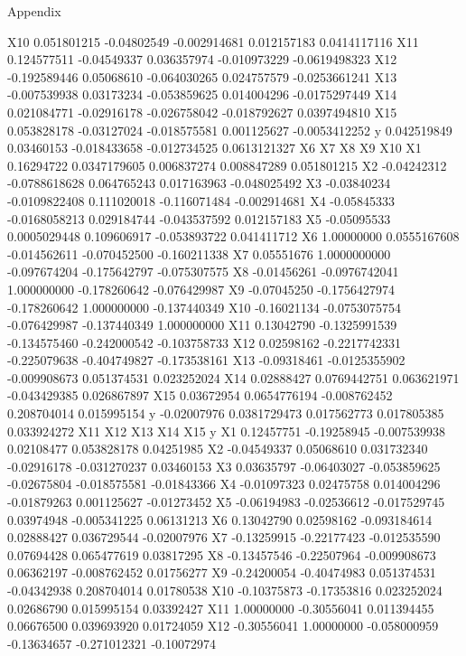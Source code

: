 \documentclass[a4paper,11pt]{article}
\begin{document}
\begin{section}{Appendix}
\begin{Schunk}
\begin{Soutput}
X10  0.051801215 -0.04802549 -0.002914681  0.012157183  0.0414117116
X11  0.124577511 -0.04549337  0.036357974 -0.010973229 -0.0619498323
X12 -0.192589446  0.05068610 -0.064030265  0.024757579 -0.0253661241
X13 -0.007539938  0.03173234 -0.053859625  0.014004296 -0.0175297449
X14  0.021084771 -0.02916178 -0.026758042 -0.018792627  0.0397494810
X15  0.053828178 -0.03127024 -0.018575581  0.001125627 -0.0053412252
y    0.042519849  0.03460153 -0.018433658 -0.012734525  0.0613121327
             X6            X7           X8           X9          X10
X1   0.16294722  0.0347179605  0.006837274  0.008847289  0.051801215
X2  -0.04242312 -0.0788618628  0.064765243  0.017163963 -0.048025492
X3  -0.03840234 -0.0109822408  0.111020018 -0.116071484 -0.002914681
X4  -0.05845333 -0.0168058213  0.029184744 -0.043537592  0.012157183
X5  -0.05095533  0.0005029448  0.109606917 -0.053893722  0.041411712
X6   1.00000000  0.0555167608 -0.014562611 -0.070452500 -0.160211338
X7   0.05551676  1.0000000000 -0.097674204 -0.175642797 -0.075307575
X8  -0.01456261 -0.0976742041  1.000000000 -0.178260642 -0.076429987
X9  -0.07045250 -0.1756427974 -0.178260642  1.000000000 -0.137440349
X10 -0.16021134 -0.0753075754 -0.076429987 -0.137440349  1.000000000
X11  0.13042790 -0.1325991539 -0.134575460 -0.242000542 -0.103758733
X12  0.02598162 -0.2217742331 -0.225079638 -0.404749827 -0.173538161
X13 -0.09318461 -0.0125355902 -0.009908673  0.051374531  0.023252024
X14  0.02888427  0.0769442751  0.063621971 -0.043429385  0.026867897
X15  0.03672954  0.0654776194 -0.008762452  0.208704014  0.015995154
y   -0.02007976  0.0381729473  0.017562773  0.017805385  0.033924272
            X11         X12          X13         X14          X15           y
X1   0.12457751 -0.19258945 -0.007539938  0.02108477  0.053828178  0.04251985
X2  -0.04549337  0.05068610  0.031732340 -0.02916178 -0.031270237  0.03460153
X3   0.03635797 -0.06403027 -0.053859625 -0.02675804 -0.018575581 -0.01843366
X4  -0.01097323  0.02475758  0.014004296 -0.01879263  0.001125627 -0.01273452
X5  -0.06194983 -0.02536612 -0.017529745  0.03974948 -0.005341225  0.06131213
X6   0.13042790  0.02598162 -0.093184614  0.02888427  0.036729544 -0.02007976
X7  -0.13259915 -0.22177423 -0.012535590  0.07694428  0.065477619  0.03817295
X8  -0.13457546 -0.22507964 -0.009908673  0.06362197 -0.008762452  0.01756277
X9  -0.24200054 -0.40474983  0.051374531 -0.04342938  0.208704014  0.01780538
X10 -0.10375873 -0.17353816  0.023252024  0.02686790  0.015995154  0.03392427
X11  1.00000000 -0.30556041  0.011394455  0.06676500  0.039693920  0.01724059
X12 -0.30556041  1.00000000 -0.058000959 -0.13634657 -0.271012321 -0.10072974

\end{Soutput}
\end{Schunk}
\end{section}
\end{document}
